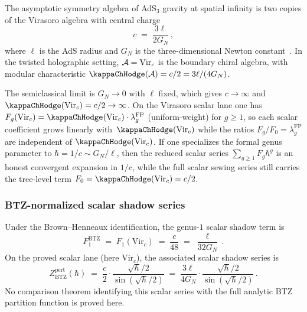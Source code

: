 \begin{setup}
\label{setup:thqg-I-brown-henneaux}
The asymptotic symmetry algebra of AdS$_3$ gravity at spatial infinity is two copies of the Virasoro algebra with central charge
\begin{equation}%
c \;=\; \frac{3\ell}{2G_N}\,,
\end{equation}
where $\ell$ is the AdS radius and $G_N$ is the three-dimensional Newton constant~\cite{BH86}. In the twisted holographic setting, $\mathcal{A} = \mathrm{Vir}_c$ is the boundary chiral algebra, with modular characteristic $\kappaChHodge(\cA) = c/2 = 3\ell/(4G_N)$.
\end{setup}

\begin{remark}
The semiclassical limit is $G_N \to 0$ with $\ell$ fixed, which gives
$c \to \infty$ and $\kappaChHodge(\mathrm{Vir}_c)=c/2 \to \infty$. On the Virasoro scalar
lane one has $F_g(\mathrm{Vir}_c) = \kappaChHodge(\mathrm{Vir}_c) \cdot \lambda_g^{\mathrm{FP}}$
\textup{(}uniform-weight\textup{)} for $g \geq
1$, so each scalar coefficient grows linearly with~$\kappaChHodge(\mathrm{Vir}_c)$ while the
ratios $F_g/F_0 = \lambda_g^{\mathrm{FP}}$ are independent of
$\kappaChHodge(\mathrm{Vir}_c)$. If one specializes the formal genus parameter to
$\hbar = 1/c \sim G_N/\ell$, then the reduced scalar series
$\sum_{g \geq 1} F_g \hbar^g$ is an honest convergent expansion in
$1/c$, while the full scalar sewing series still carries the
tree-level term $F_0=\kappaChHodge(\mathrm{Vir}_c)=c/2$.
\end{remark}

\subsubsection{BTZ-normalized scalar shadow series}

\begin{theorem}
Under the Brown--Henneaux identification, the genus-$1$ scalar shadow
term is
\begin{equation}%
F_1^{\mathrm{BTZ}} \;=\; F_1(\mathrm{Vir}_c) \;=\; \frac{c}{48} \;=\; \frac{\ell}{32G_N}\,.
\end{equation}
On the proved scalar lane \textup{(}here $\mathrm{Vir}_c$\textup{)}, the
associated scalar shadow series is
\begin{equation}%
Z_{\mathrm{BTZ}}^{\mathrm{pert}}(\hbar) \;=\; \frac{c}{2} \cdot \frac{\sqrt{\hbar}/2}{\sin(\sqrt{\hbar}/2)} \;=\; \frac{3\ell}{4G_N} \cdot \frac{\sqrt{\hbar}/2}{\sin(\sqrt{\hbar}/2)}\,.
\end{equation}
No comparison theorem identifying this scalar series with the full
analytic BTZ partition function is proved here.
\end{theorem}

